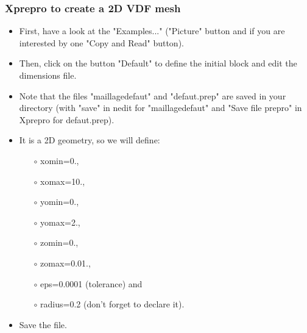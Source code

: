 \documentclass[10pt]{beamer}
\begin{document}
\begin{frame}
\frametitle{Xprepro to create a 2D VDF mesh}
\begin{block}{}

\begin{itemize}
\item First, have a look at the "Examples..." ("Picture" button and if you are interested by one "Copy and Read" button).

\item Then, click on the button "Default" to define the initial block and edit the dimensions file. 
\item Note that the files "maillagedefaut" and "defaut.prep" are saved in your directory (with "save" in nedit for "maillagedefaut" and "Save file prepro" in Xprepro for defaut.prep).

\item It is a 2D geometry, so we will define:
    \begin{itemize}
    \item [$\circ$] xomin=0.,
    \item [$\circ$] xomax=10.,
    \item [$\circ$] yomin=0.,
    \item [$\circ$] yomax=2.,
    \item [$\circ$] zomin=0.,
    \item [$\circ$] zomax=0.01.,
    \item [$\circ$] eps=0.0001 (tolerance) and
    \item [$\circ$] radius=0.2 (don't forget to declare it).
    \end{itemize}
\item Save the file.
\end{itemize}

\end{block}
\end{frame}
\end{document}
